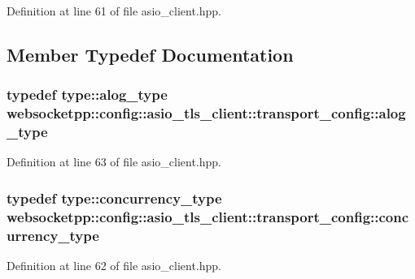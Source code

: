 Definition at line 61 of file asio\+\_\+client.\+hpp.



\subsection{Member Typedef Documentation}
\hypertarget{structwebsocketpp_1_1config_1_1asio__tls__client_1_1transport__config_a37d7fb266b524e1241062c6cc036a311}{}
\subsubsection[{alog\+\_\+type}]{\setlength{\rightskip}{0pt plus 5cm}typedef {\bf type\+::alog\+\_\+type} {\bf websocketpp\+::config\+::asio\+\_\+tls\+\_\+client\+::transport\+\_\+config\+::alog\+\_\+type}}\label{structwebsocketpp_1_1config_1_1asio__tls__client_1_1transport__config_a37d7fb266b524e1241062c6cc036a311}


Definition at line 63 of file asio\+\_\+client.\+hpp.

\hypertarget{structwebsocketpp_1_1config_1_1asio__tls__client_1_1transport__config_a004ad3230230efb93f874f811299d9cb}{}
\subsubsection[{concurrency\+\_\+type}]{\setlength{\rightskip}{0pt plus 5cm}typedef {\bf type\+::concurrency\+\_\+type} {\bf websocketpp\+::config\+::asio\+\_\+tls\+\_\+client\+::transport\+\_\+config\+::concurrency\+\_\+type}}\label{structwebsocketpp_1_1config_1_1asio__tls__client_1_1transport__config_a004ad3230230efb93f874f811299d9cb}


Definition at line 62 of file asio\+\_\+client.\+hpp.

